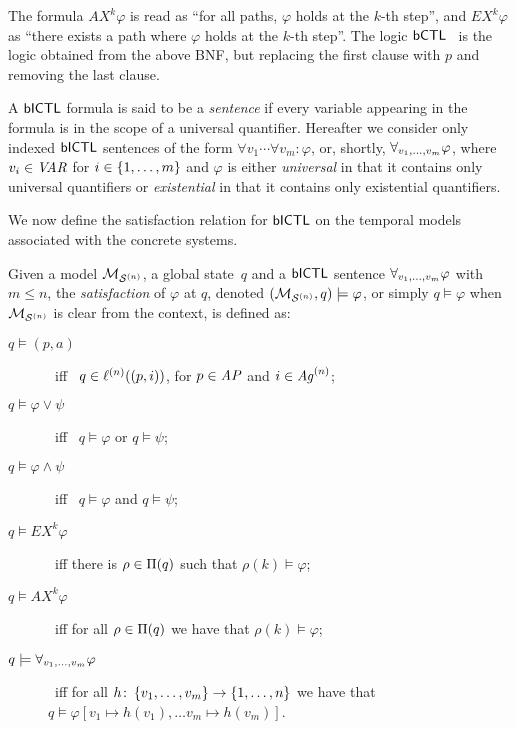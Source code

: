 The formula $AX^k \varphi$ is read as ``for all paths, $\varphi$ holds at the
$k$-th step'', and $EX^k \varphi$ as ``there exists a path where $\varphi$
holds at the $k$-th step''.
%
The logic $\sf{bCTL}$~\cite{Akintunde+22} is the logic obtained from the above BNF, but
replacing the first clause with $p$ and removing the last clause.

A $\sf{bICTL}$ formula is said to be a \emph{sentence} if every variable appearing in the
formula is in the scope of a universal quantifier. Hereafter we consider only
indexed $\sf{bICTL}$ sentences of the form $\forall v_1 \cdots \forall v_m \colon
\varphi$, or, shortly, $\forall_{v_1,\ldots,v_m} \varphi$, where $v_i \in \it{VAR}$ for $i \in
\left \{ 1,\ldots,m \right \}$ and $\varphi$ is either {\em universal} in that it contains
only universal quantifiers or {\em existential} in that it contains only
existential quantifiers.


We now define the satisfaction relation for $\sf{bICTL}$ on the temporal models
associated with the concrete systems.

\begin{definition}[Satisfaction]
  \label{def:sat} 
  Given a model $\mathcal{M}_{\mathcal{S}^{(n)}}$, a global state~$q$ and a $\sf{bICTL}$ sentence
  $\forall_{v_1,\ldots,v_m} \varphi$ with $m \leq n$, the \emph{satisfaction} of $\varphi$ at $q$,
  denoted $(\mathcal{M}_{\mathcal{S}^{(n)}}, q) \models\varphi$, or simply $q \models \varphi$ when
  $\mathcal{M}_{\mathcal{S}^{(n)}}$ is clear from the context, is defined as:
  \begin{description}
  \item[$q \models (p, a)$] \ iff \ $q \in \ell^{(n)}((p, i))$, for $p \in
  \it{AP}$ and $i \in \mathit{Ag}^{(n)}$; 
  \item[$q \models \varphi \lor \psi$] \ iff \ $q \models \varphi$ or $q \models
  \psi$;
  \item[$q \models \varphi \land \psi$] \ iff \ $q \models \varphi$ and $q
  \models \psi$;
  \item[$q \models EX^k  \varphi$] \ iff  there is $\rho \in \Pi(q)$ such
  that $\rho(k) \models \varphi$;
  \item[$q \models AX^k  \varphi$] \ iff for all $\rho \in \Pi(q)$ we
  have that $\rho(k) \models \varphi$;
  \item[$q \models \forall_{v_1,\ldots,v_m} \varphi$] \ iff for all $h \colon \left \{ v_1, \ldots, v_m \right \}
  \rightarrow \left \{ {1}, \ldots,{n} \right \}$ we have that $q \models 
  \varphi[v_1 \mapsto h(v_1), \ldots v_m \mapsto h(v_m)]$.
\end{description}
\end{definition}


